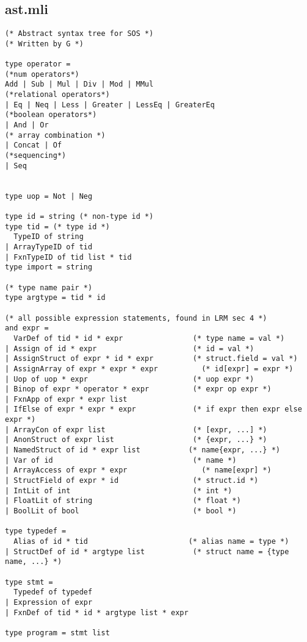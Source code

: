 \documentclass[main.tex]{subfiles}
\begin{document}
\subsection{ast.mli}
\begin{lstlisting}
(* Abstract syntax tree for SOS *)
(* Written by G *)

type operator = 
(*num operators*)
Add | Sub | Mul | Div | Mod | MMul
(*relational operators*)
| Eq | Neq | Less | Greater | LessEq | GreaterEq 
(*boolean operators*)
| And | Or 
(* array combination *)
| Concat | Of
(*sequencing*)
| Seq


type uop = Not | Neg

type id = string (* non-type id *)
type tid = (* type id *)
  TypeID of string
| ArrayTypeID of tid
| FxnTypeID of tid list * tid
type import = string

(* type name pair *)
type argtype = tid * id

(* all possible expression statements, found in LRM sec 4 *)
and expr = 
  VarDef of tid * id * expr                (* type name = val *)
| Assign of id * expr                      (* id = val *)
| AssignStruct of expr * id * expr         (* struct.field = val *)
| AssignArray of expr * expr * expr          (* id[expr] = expr *)
| Uop of uop * expr                        (* uop expr *)
| Binop of expr * operator * expr          (* expr op expr *)
| FxnApp of expr * expr list
| IfElse of expr * expr * expr             (* if expr then expr else expr *)
| ArrayCon of expr list                    (* [expr, ...] *)
| AnonStruct of expr list                  (* {expr, ...} *)
| NamedStruct of id * expr list           (* name{expr, ...} *)
| Var of id                                (* name *)
| ArrayAccess of expr * expr                 (* name[expr] *)
| StructField of expr * id                 (* struct.id *)
| IntLit of int                            (* int *)
| FloatLit of string                       (* float *)
| BoolLit of bool                          (* bool *)

type typedef = 
  Alias of id * tid                       (* alias name = type *)
| StructDef of id * argtype list           (* struct name = {type name, ...} *)

type stmt = 
  Typedef of typedef
| Expression of expr
| FxnDef of tid * id * argtype list * expr

type program = stmt list
\end{lstlisting}
\end{document}

